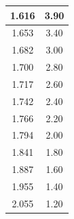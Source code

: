 \documentclass[a4paper, fontsize=14pt]{article}
\begin{document}
\begin{figure}[H]
\begin{floatrow}
{\begin{tabular}{|c|c|}
1.616 &  3.90 \\\hline
1.653 &  3.40 \\\hline
1.682 &  3.00 \\\hline
1.700 &  2.80 \\\hline
1.717 &  2.60 \\\hline
1.742 &  2.40 \\\hline
1.766 &  2.20 \\\hline
1.794 &  2.00 \\\hline
1.841 &  1.80 \\\hline
1.887 &  1.60 \\\hline
1.955 &  1.40 \\\hline
2.055 &  1.20 \\\hline
\end{tabular}}
\end{floatrow}
\end{figure}
\end{document}
